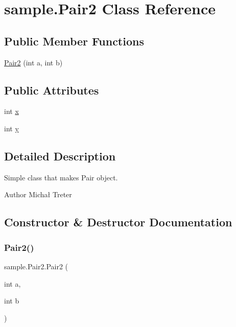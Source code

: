 \hypertarget{classsample_1_1_pair2}{}\section{sample.\+Pair2 Class Reference}
\label{classsample_1_1_pair2}
\subsection*{Public Member Functions}
\begin{DoxyCompactItemize}
\item 
\hyperlink{classsample_1_1_pair2_a9099babd99dbfaa6803f625e9d2b5161}{Pair2} (int a, int b)
\end{DoxyCompactItemize}
\subsection*{Public Attributes}
\begin{DoxyCompactItemize}
\item 
int \hyperlink{classsample_1_1_pair2_a179377ecccdae7e33bc0c222d41a9351}{x}
\item 
int \hyperlink{classsample_1_1_pair2_a6958b07d5cba3855fe3cf7051bbfbb60}{y}
\end{DoxyCompactItemize}


\subsection{Detailed Description}
Simple class that makes Pair object. \begin{DoxyAuthor}{Author}
Michał Treter 
\end{DoxyAuthor}


\subsection{Constructor \& Destructor Documentation}
\mbox{\label{classsample_1_1_pair2_a9099babd99dbfaa6803f625e9d2b5161}} 
\subsubsection{\texorpdfstring{Pair2()}{Pair2()}}
{\footnotesize\ttfamily sample.\+Pair2.\+Pair2 (\begin{DoxyParamCaption}\item[{int}]{a,  }\item[{int}]{b }\end{DoxyParamCaption})}

